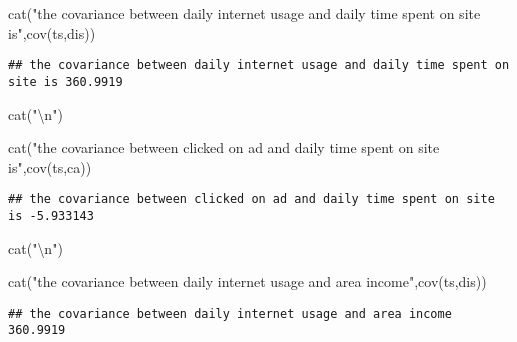 \documentclass[
]{article}
\newenvironment{Shaded}{\begin{snugshade}}{\end{snugshade}}
\newcommand{\FunctionTok}[1]{\textcolor[rgb]{0.00,0.00,0.00}{#1}}
\newcommand{\NormalTok}[1]{#1}
\newcommand{\SpecialCharTok}[1]{\textcolor[rgb]{0.00,0.00,0.00}{#1}}
\newcommand{\StringTok}[1]{\textcolor[rgb]{0.31,0.60,0.02}{#1}}
\begin{document}
\begin{Shaded}
\begin{Highlighting}[]
\FunctionTok{cat}\NormalTok{(}\StringTok{"the covariance between daily internet usage and daily time spent on site is"}\NormalTok{,}\FunctionTok{cov}\NormalTok{(ts,dis))}
\end{Highlighting}
\end{Shaded}

\begin{verbatim}
## the covariance between daily internet usage and daily time spent on site is 360.9919
\end{verbatim}

\begin{Shaded}
\begin{Highlighting}[]
\FunctionTok{cat}\NormalTok{(}\StringTok{"}\SpecialCharTok{\textbackslash{}n}\StringTok{"}\NormalTok{)}
\end{Highlighting}
\end{Shaded}

\begin{Shaded}
\begin{Highlighting}[]
\FunctionTok{cat}\NormalTok{(}\StringTok{"the covariance between clicked on ad and daily time spent on site is"}\NormalTok{,}\FunctionTok{cov}\NormalTok{(ts,ca))}
\end{Highlighting}
\end{Shaded}

\begin{verbatim}
## the covariance between clicked on ad and daily time spent on site is -5.933143
\end{verbatim}

\begin{Shaded}
\begin{Highlighting}[]
\FunctionTok{cat}\NormalTok{(}\StringTok{"}\SpecialCharTok{\textbackslash{}n}\StringTok{"}\NormalTok{)}
\end{Highlighting}
\end{Shaded}

\begin{Shaded}
\begin{Highlighting}[]
\FunctionTok{cat}\NormalTok{(}\StringTok{"the covariance between daily internet usage and area income"}\NormalTok{,}\FunctionTok{cov}\NormalTok{(ts,dis))}
\end{Highlighting}
\end{Shaded}

\begin{verbatim}
## the covariance between daily internet usage and area income 360.9919
\end{verbatim}
\end{document}

